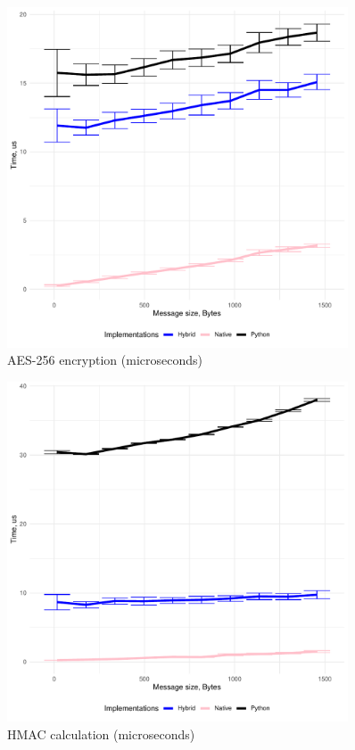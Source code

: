 \begin{figure}[!ht]
    \centering
    \includegraphics[width=0.9\textwidth]{graphics/crypto/aes.pdf}
    \caption{AES-256 encryption (microseconds)}
    \label{fig:aes}
\end{figure}

\begin{figure}[!ht]
    \centering
    \includegraphics[width=0.9\textwidth]{graphics/crypto/hmac.pdf}
    \caption{HMAC calculation (microseconds)}
    \label{fig:hmac}
\end{figure}


